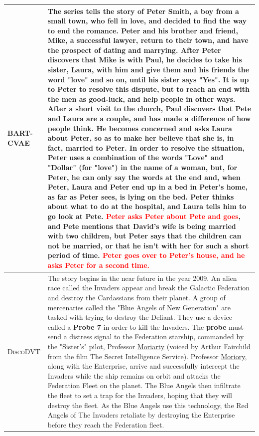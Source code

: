 \documentclass[11pt]{article}
\begin{document}
\begin{table}[t!]
\begin{tabularx}{2\columnwidth}{l|X}
    \midrule[0.5pt]
    {BART-CVAE} & The series tells the story of Peter Smith, a boy from a small town, who fell in love, and decided to find the way to end the romance. 
Peter and his brother and friend, Mike, a successful lawyer, return to their town, and have the prospect of dating and marrying. 
After Peter discovers that Mike is with Paul, he decides to take his sister, Laura, with him and give them and his friends the word "love" and so on, until his sister says "Yes". 
It is up to Peter to resolve this dispute, but to reach an end with the men as good-luck, and help people in other ways. 
After a short visit to the church, Paul discovers that Pete and Laura are a couple, and has made a difference of how people think. 
He becomes concerned and asks Laura about Peter, so as to make her believe that she is, in fact, married to Peter. 
In order to resolve the situation, Peter uses a combination of the words "Love" and "Dollar" (for "love") in the name of a woman, but, for Peter, he can only say the words at the end and, when Peter, Laura and Peter end up in a bed in Peter's home, as far as Peter sees, is lying on the bed. 
Peter thinks about what to do at the hospital, and Laura tells him to go look at Pete. 
\textcolor{red}{Peter asks Peter about Pete and goes}, and Pete mentions that David's wife is being married with two children, but Peter says that the children can not be married, or that he isn't with her for such a short period of time. 
\textcolor{red}{Peter goes over to Peter's house, and he asks Peter for a second time.} \\
    \midrule[0.5pt]
    \textsc{DiscoDVT} & The story begins in the near future in the year 2009. 
An alien race called the Invaders appear and break the Galactic Federation and destroy the Cardassians from their planet. 
A group of mercenaries called the "Blue Angels of New Generation" are tasked with trying to destroy the Defiant. 
They use a device called a \textbf{Probe 7} in order to kill the Invaders. 
The \textbf{probe} must send a distress signal to the Federation starship, commanded by the "Sister's" pilot, Professor \underline{Moriarty} (voiced by Arthur Fairchild from the film The Secret Intelligence Service). 
Professor \underline{Moriory}, along with the Enterprise, arrive and successfully intercept the Invaders while the ship remains on orbit and attacks the Federation Fleet on the planet. 
The Blue Angels then infiltrate the fleet to set a trap for the Invaders, hoping that they will destroy the fleet. 
As the Blue Angels use this technology, the Red Angels of The Invaders retaliate by destroying the Enterprise before they reach the Federation fleet. 

\end{tabularx}
\end{table}
\end{document}
